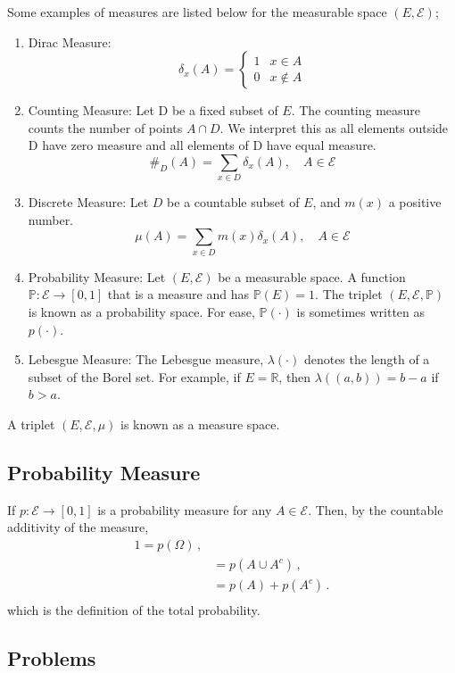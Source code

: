 Some examples of measures are listed below for the measurable space $(E, \mathcal{E})$;
\begin{enumerate}
	\item Dirac Measure: \[\delta_x(A) = \begin{cases}
		1 & x \in A \\ 0 & x\notin A 
	\end{cases}\]
	\item Counting Measure: Let D be a fixed subset of $E$. The counting measure counts the number of points $A\cap D$. We interpret this as all elements outside D have zero measure and all elements of D have equal measure. \[ \#_D(A) = \sum_{x\in D} \delta_x(A),\quad A \in \mathcal{E}\]
	\item Discrete Measure: Let $D$ be a countable subset of $E$, and $m(x)$ a positive number.  \[\mu(A) = \sum_{x\in D} m(x) \delta_x(A), \quad A\in \mathcal{E}\]
	\item Probability Measure: Let $(E, \mathcal{E})$ be a measurable space. A function $\mathbb{P}: \mathcal{E} \rightarrow [0, 1]$ that is a measure and has $\mathbb{P}(E) = 1$. The triplet $(E, \mathcal{E}, \mathbb{P})$ is known as a probability space. For ease, $\mathbb{P}(\cdot)$ is sometimes written as $p(\cdot)$.
	\item Lebesgue Measure: The Lebesgue measure, $\lambda(\cdot)$ denotes the length of a subset of the Borel set. For example, if $E = \mathbb{R}$, then $\lambda((a, b)) = b-a$ if $b > a$.
\end{enumerate}

A triplet $(E, \mathcal{E}, \mu)$ is known as a measure space.

\subsection{Probability Measure}

If $p: \mathcal{E} \rightarrow [0, 1]$ is a probability measure for any $A \in \mathcal{E}$. Then, by the countable additivity of the measure, 
\begin{align*}
	1=p(\Omega)\,,\\
	&= p(A\cup A^c)\,,\\
	&= p(A) + p(A^c)\,.\\
\end{align*}
which is the definition of the total probability. 

 



\subsection{Problems}

